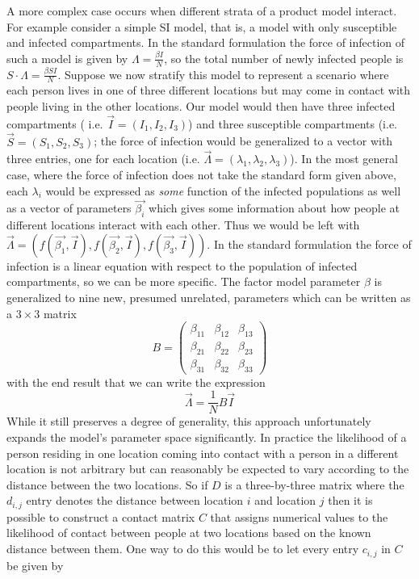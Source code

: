\documentclass{article}
\theoremstyle{definition}
\begin{document}
A more complex case occurs when different strata of a product model interact. For example consider a simple SI model, that is, a model with only susceptible and infected compartments. In the standard formulation the force of infection of such a model is given by $\Lambda = \frac{\beta I}{N}$, so the total number of newly infected people is $S\cdot \Lambda = \frac{\beta S I}{N}$. Suppose we now stratify this model to represent a scenario where each person lives in one of three different locations but may come in contact with people living in the other locations. Our model would then have three infected compartments ( i.e. $\vec{I} = (I_1, I_2, I_3)$) and three susceptible compartments (i.e. $\vec{S} = (S_1, S_2, S_3)$; the force of infection would be generalized to a vector with three entries, one for each location (i.e. $\vec{\Lambda} = (\lambda_1, \lambda_2, \lambda_3)$). 
In the most general case, where the force of infection does not take the standard form given above, each $\lambda_i$ would be expressed as \emph{some} function of the infected populations as well as a vector of parameters $\vec{\beta_i}$ which gives some information about how people at different locations interact with each other. Thus we would be left with $\vec{\Lambda} = (f(\vec{\beta_1}, \vec{I}), f(\vec{\beta_2}, \vec{I}), f(\vec{\beta_3}, \vec{I}))$. 
In the standard formulation the force of infection is a linear equation with respect to the population of infected compartments, so we can be more specific. The factor model parameter $\beta$ is generalized to nine new, presumed unrelated, parameters which can be written as a $3 \times 3$ matrix
\[
    B = \begin{pmatrix}
        \beta_{11} & \beta_{12} & \beta_{13} \\
        \beta_{21} & \beta_{22} & \beta_{23} \\
        \beta_{31} & \beta_{32} & \beta_{33}
    \end{pmatrix}
\]
with the end result that we can write the expression
\[
    \vec{\Lambda} = \frac{1}{N} B \vec{I}
\]
While it still preserves a degree of generality, this approach unfortunately expands the model's parameter space significantly. In practice the likelihood of a person residing in one location coming into contact with a person in a different location is not arbitrary but can reasonably be expected to vary according to the distance between the two locations. So if $D$ is a three-by-three matrix where the $d_{i,j}$ entry denotes the distance between location $i$ and location $j$ then it is possible to construct a contact matrix $C$ that assigns numerical values to the likelihood of contact between people at two locations based on the known distance between them. One way to do this would be to let every entry $c_{i,j}$ in $C$ be given by
\end{document}
